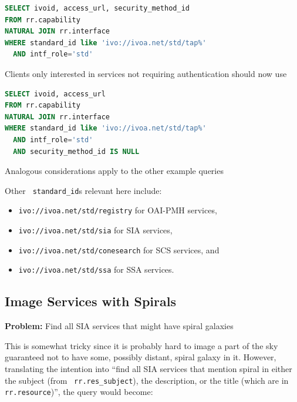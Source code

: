 \documentclass[11pt,a4paper]{ivoa}
\newcommand{\rtent}[1]{\texttt{\color{rtcolor} #1}}
\begin{document}
\begin{lstlisting}[language=SQL,flexiblecolumns=true]
SELECT ivoid, access_url, security_method_id
FROM rr.capability
NATURAL JOIN rr.interface
WHERE standard_id like 'ivo://ivoa.net/std/tap%'
  AND intf_role='std'
\end{lstlisting}

Clients only interested in services not requiring authentication should
now use

\begin{lstlisting}[language=SQL,flexiblecolumns=true]
SELECT ivoid, access_url
FROM rr.capability
NATURAL JOIN rr.interface
WHERE standard_id like 'ivo://ivoa.net/std/tap%'
  AND intf_role='std'
  AND security_method_id IS NULL
\end{lstlisting}

Analogous considerations apply to the other example queries

Other \rtent{standard\_id}s relevant here include:


\begin{itemize}

\item \texttt{ivo://ivoa.net/std/registry} for OAI-PMH services,{}

\item \texttt{ivo://ivoa.net/std/sia} for SIA services,{}

\item \texttt{ivo://ivoa.net/std/conesearch} for SCS services,
and{}

\item \texttt{ivo://ivoa.net/std/ssa} for SSA services.{}

\end{itemize}

\subsection{Image Services with Spirals}

\textbf{Problem:} Find all SIA services that might have spiral
galaxies

This is somewhat tricky since it is probably hard to image a part
of the sky guaranteed not to have some, possibly distant, spiral galaxy
in it.  However, translating the intention into ``find all SIA services
that mention spiral in either the subject (from 
\rtent{rr.res\_subject}), the description, or the
title (which are in 
\rtent{rr.resource})'', 
the query would become:
\end{document}

